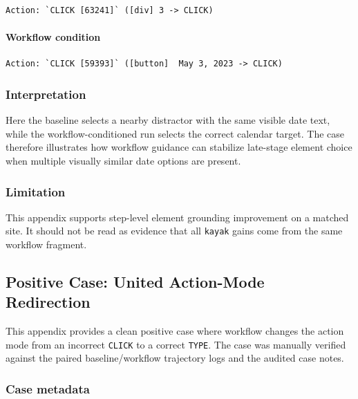 \begin{verbatim}
Action: `CLICK [63241]` ([div] 3 -> CLICK)
\end{verbatim}

\paragraph{Workflow condition}

\begin{verbatim}
Action: `CLICK [59393]` ([button]  May 3, 2023 -> CLICK)
\end{verbatim}

\subsubsection{Interpretation}

Here the baseline selects a nearby distractor with the same visible date
text, while the workflow-conditioned run selects the correct calendar
target. The case therefore illustrates how workflow guidance can
stabilize late-stage element choice when multiple visually similar date
options are present.

\subsubsection{Limitation}

This appendix supports step-level element grounding improvement on a
matched site. It should not be read as evidence that all \texttt{kayak}
gains come from the same workflow fragment.


\clearpage
\subsection{Positive Case: United Action-Mode Redirection}\label{app:B2}

This appendix provides a clean positive case where workflow changes the
action mode from an incorrect \texttt{CLICK} to a correct
\texttt{TYPE}. The case was manually verified against the paired
baseline/workflow trajectory logs and the audited case notes.

\subsubsection{Case metadata}

